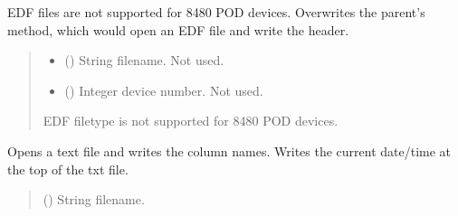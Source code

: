 \documentclass[letterpaper,10pt,english]{sphinxmanual}
\begin{document}
\begin{fulllineitems}
\begin{fulllineitems}
\label{\detokenize{Setup_8480SC:Setup_8480SC.Setup_8480SC._OpenSaveFile_EDF}}
\pysigstartsignatures
{}
\pysigstopsignatures
\sphinxAtStartPar
EDF files are not supported for 8480 POD devices. Overwrites the         parent’s method, which would open an EDF file and write the header.
\begin{quote}\begin{description}
\begin{itemize}
\item {} 
\sphinxAtStartPar
{} () \textendash{} String filename. Not used.

\item {} 
\sphinxAtStartPar
{} () \textendash{} Integer device number. Not used.

\end{itemize}

\sphinxAtStartPar
{} \textendash{} EDF filetype is not supported for 8480 POD devices.

\end{description}\end{quote}

\end{fulllineitems}


\begin{fulllineitems}
\label{\detokenize{Setup_8480SC:Setup_8480SC.Setup_8480SC._OpenSaveFile_TXT}}
\pysigstartsignatures
{}
\pysigstopsignatures
\sphinxAtStartPar
Opens a text file and writes the column names. Writes the current date/time             at the top of the txt file.
\begin{quote}\begin{description}
\sphinxAtStartPar
{} () \textendash{} String filename.


\end{description}
\end{quote}
\end{fulllineitems}
\end{fulllineitems}
\end{document}
